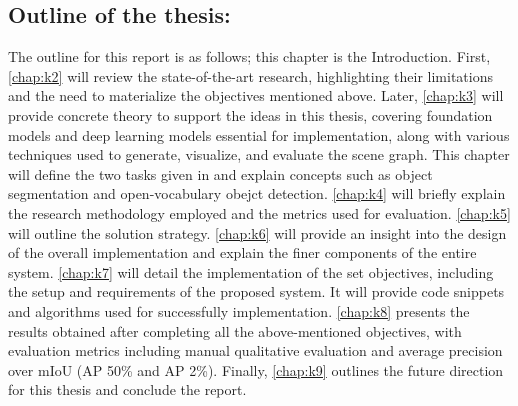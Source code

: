\subsection{Outline of the thesis:}	
The outline for this report is as follows; this chapter is the Introduction. 
First, \cref{chap:k2} will review the state-of-the-art research, highlighting their limitations and the need to materialize the objectives mentioned above. 
Later, \cref{chap:k3} will provide concrete theory to support the ideas in this thesis, covering foundation models and deep learning models essential for 
implementation, along with various techniques used to generate, visualize, and evaluate the scene graph. This chapter will define the two tasks given in 
\cite{delitzas2024scenefun3d} and explain concepts such as object segmentation and open-vocabulary obejct detection.
\cref{chap:k4} will briefly explain the research methodology employed and the metrics used for evaluation. 
\cref{chap:k5} will outline the solution strategy. \cref{chap:k6} will provide an insight into the design of the overall implementation and explain the
finer components of the entire system. \cref{chap:k7} will detail the implementation of the set objectives, including the setup and requirements of 
the proposed system. It will provide code snippets and algorithms used for successfully implementation. 
\cref{chap:k8} presents the results obtained after completing all the above-mentioned objectives, with evaluation metrics including manual qualitative 
evaluation and average precision over mIoU (AP 50\% and AP 2\%). Finally, \cref{chap:k9} outlines the future direction for this thesis and conclude the report.


